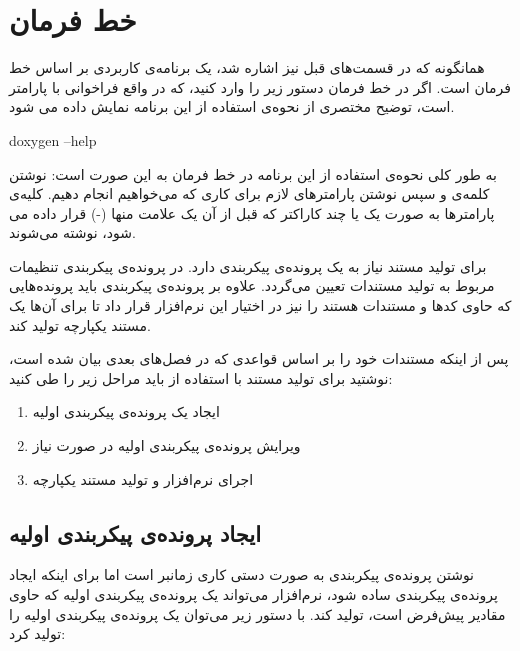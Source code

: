 \section{خط فرمان}

 همانگونه که در قسمت‌های قبل نیز اشاره شد،  یک برنامه‌ی کاربردی بر
اساس خط فرمان است. اگر در خط فرمان دستور زیر را وارد کنید، که در واقع فراخوانی
 با پارامتر  است، توضیح مختصری از نحوه‌ی استفاده از این
برنامه نمایش داده می شود.

\begin{Shell} 
doxygen --help
\end{Shell}

به طور کلی نحوه‌ی استفاده از این برنامه در خط فرمان به این صورت است: نوشتن
کلمه‌ی  و سپس نوشتن پارامترهای لازم برای کاری که می‌خواهیم انجام
دهیم. کلیه‌ی پارامترها به صورت یک یا چند کاراکتر که قبل از آن یک علامت منها (-)
قرار داده می شود، نوشته می‌شوند.

برای تولید مستند نیاز به یک پرونده‌ی پیکربندی دارد. در پرونده‌ی پیکربندی تنظیمات
مربوط به تولید مستندات تعیین می‌گردد. علاوه بر پرونده‌ی پیکربندی باید
پرونده‌هایی که حاوی کدها و مستندات هستند را نیز در اختیار این نرم‌افزار قرار داد
تا برای آن‌ها یک مستند یکپارچه تولید کند.

پس از اینکه مستندات خود را بر اساس قواعدی که در فصل‌های بعدی بیان شده است، 
نوشتید برای تولید مستند با استفاده از  باید مراحل زیر را طی کنید:
\begin{enumerate}
\item ایجاد یک پرونده‌ی پیکربندی اولیه
\item ویرایش پرونده‌ی پیکربندی اولیه در صورت نیاز
\item اجرای نرم‌افزار  و تولید مستند یکپارچه
\end{enumerate}

\subsection{ایجاد پرونده‌ی پیکربندی اولیه}

نوشتن پرونده‌ی پیکربندی به صورت دستی کاری زمانبر است اما برای اینکه ایجاد
پرونده‌ی پیکربندی ساده شود، نرم‌افزار  می‌تواند یک پرونده‌ی پیکربندی
اولیه که حاوی مقادیر پیش‌فرض است، تولید کند. با دستور زیر می‌توان یک پرونده‌ی
پیکربندی اولیه را تولید کرد:

